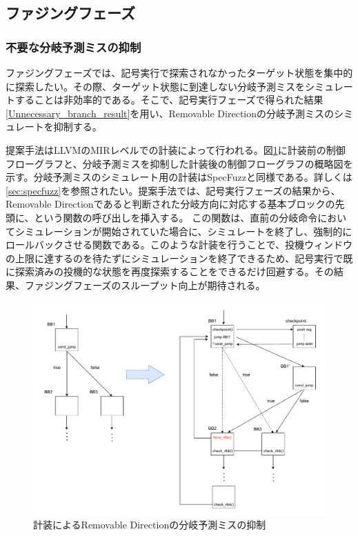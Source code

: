 \subsection{ファジングフェーズ}

\subsubsection{不要な分岐予測ミスの抑制}
ファジングフェーズでは、記号実行で探索されなかったターゲット状態を集中的に探索したい。その際、ターゲット状態に到達しない分岐予測ミスをシミュレートすることは非効率的である。そこで、記号実行フェーズで得られた結果\ref{Unnecessary_branch_result}を用い、Removable Directionの分岐予測ミスのシミュレートを抑制する。\par
提案手法はLLVMのMIRレベルでの計装によって行われる。図\ref{fig:Fuzzing_Phase_cfg}に計装前の制御フローグラフと、分岐予測ミスを抑制した計装後の制御フローグラフの概略図を示す。分岐予測ミスのシミュレート用の計装はSpecFuzzと同様である。詳しくは\ref{sec:specfuzz}を参照されたい。提案手法では、記号実行フェーズの結果から、Removable Directionであると判断された分岐方向に対応する基本ブロックの先頭に、という関数の呼び出しを挿入する。
この関数は、直前の分岐命令においてシミュレーションが開始されていた場合に、シミュレートを終了し、強制的にロールバックさせる関数である。このような計装を行うことで、投機ウィンドウの上限に達するのを待たずにシミュレーションを終了できるため、記号実行で既に探索済みの投機的な状態を再度探索することをできるだけ回避する。その結果、ファジングフェーズのスループット向上が期待される。\par

\begin{figure}[tb]
  \centering
  \includegraphics[width=\linewidth]{img/Fuzzing_Phase.drawio.pdf}
  \caption{計装によるRemovable Directionの分岐予測ミスの抑制}\label{fig:Fuzzing_Phase_cfg}
\end{figure}

